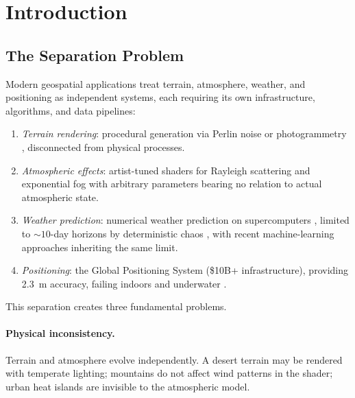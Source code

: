 \documentclass[10pt,twocolumn]{article}
\theoremstyle{definition}
\theoremstyle{remark}
\begin{document}
\section{Introduction}\label{sec:intro}

\subsection{The Separation Problem}\label{sec:separation}

Modern geospatial applications treat terrain, atmosphere,
weather, and positioning as independent systems, each requiring
its own infrastructure, algorithms, and data pipelines:

\begin{enumerate}[leftmargin=*,itemsep=2pt]
\item \emph{Terrain rendering}: procedural generation via
  Perlin noise \citep{Perlin1985} or photogrammetry
  \citep{Schoenberger2016,Anguelov2010}, disconnected from
  physical processes.
\item \emph{Atmospheric effects}: artist-tuned shaders for
  Rayleigh scattering and exponential fog
  \citep{Nishita1993,Bruneton2008,Hillaire2020} with
  arbitrary parameters bearing no relation to actual
  atmospheric state.
\item \emph{Weather prediction}: numerical weather prediction
  on supercomputers \citep{Bauer2015}, limited to
  ${\sim}10$-day horizons by deterministic chaos
  \citep{Lorenz1963,Lorenz1969}, with recent machine-learning
  approaches \citep{Lam2023,Pathak2022} inheriting the same
  limit.
\item \emph{Positioning}: the Global Positioning System
  (\$10B+ infrastructure), providing 2.3~m accuracy, failing
  indoors and underwater \citep{Kaplan1966,Misra2006}.
\end{enumerate}

This separation creates three fundamental problems.

\paragraph{Physical inconsistency.}
Terrain and atmosphere evolve independently.  A desert terrain
may be rendered with temperate lighting; mountains do not
affect wind patterns in the shader; urban heat islands are
invisible to the atmospheric model.
\end{document}
